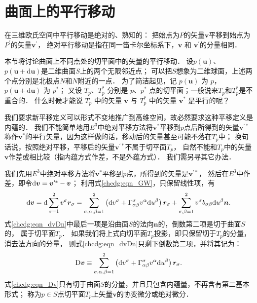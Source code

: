\section{曲面上的平行移动}\label{chcdg:sec_pt}
在三维欧氏空间中平行移动是绝对的、熟知的：
把始点为$P$的矢量$\boldsymbol{v}$平移到始点为$P^{\prime}$的矢量$\boldsymbol{v}^{\prime}$，
{\kaishu 绝对平行移动}是指在同一笛卡尔坐标系下，$\boldsymbol{v}$ 和 $\boldsymbol{v}^{\prime}$的分量相同．


本节将讨论曲面上不同点处的切平面中的矢量的平行移动．
设$p(\boldsymbol{u})$、$ p(\boldsymbol{u}+\mathrm{d} \boldsymbol{u})$是二维曲面$S$上的两个无限邻近点；
可以把$S$想象为二维球面，上述两个点分别是北极点$N$和$N$附近的一点．
为了简洁起见，记 $p(\boldsymbol{u})$ 为 $p$，$ p(\boldsymbol{u}+\mathrm{d} \boldsymbol{u})$ 为 $p^*$；
又设 $T_p$、$ T_p^*$ 分别是 $p$、$ p^*$ 点的切平面；一般说来$T_p$和$ T_p^*$是不重合的．
什么时候才能说 $T_p$ 中的矢量 $\boldsymbol{v}$ 与 $T_p^*$ 中的矢量 $\boldsymbol{v}^*$ 是平行的呢？

我们要求{\kaishu 新平移定义}可以形式不变地推广到高维空间，故必然要求这种平移定义是内蕴的．
我们不能简单地用$E^3$中绝对平移方法将$\boldsymbol{v}^*$平移到$p$点后所得到的矢量$\boldsymbol{v}^{\prime *}$
称作$\boldsymbol{v}^*$的平行矢量，因为这样做的话，移动后的矢量甚至可能不落在$T_p$中；
换句话说，按照绝对平移，平移后的矢量$\boldsymbol{v}^{\prime *}$不属于切平面$T_p$，
自然不能和$T_p$中的矢量$\boldsymbol{v}$作差或相比较（指内蕴方式作差，不是外蕴方式）．
我们需另寻其它办法．

我们先用$E^3$中绝对平移方法将$\boldsymbol{v}^*$平移到$p$点，所得到的矢量是$\boldsymbol{v}^{\prime *}$，
然后在$E^3$中作差，即令${\rm d} \boldsymbol{v} = \boldsymbol{v}^{\prime *} -\boldsymbol{v}$；
利用式\eqref{chcdg:eqn_GW}，只保留线性项，有
\begin{align}
    {\rm d} \boldsymbol{v}= \mathrm{d} \sum_{\sigma=1}^{2} v^\sigma \boldsymbol{r}_\sigma 
    = \sum_{\sigma,\alpha,\beta=1}^{2} \left(\mathrm{d}   v^\sigma  
    + \Gamma_{\alpha \beta}^\sigma v^\alpha \mathrm{d} u^\beta  \right) \boldsymbol{r}_\sigma
    + \sum_{\sigma,\beta=1}^{2} v^\sigma b_{\sigma \beta}  \mathrm{d} u^\beta \boldsymbol{n} . 
    \label{chcdg:eqn_dvDn}
\end{align} %
式\eqref{chcdg:eqn_dvDn}中最后一项是沿曲面$S$的法向$\boldsymbol{n}$的，倒数第二项是切于曲面$S$的，
属于切平面$T_p$．
如果我们将上式向切平面$T_p$投影，即只保留切于$T_p$的分量，消去法方向的分量，
则式\eqref{chcdg:eqn_dvDn}只剩下倒数第二项，并将其记为：
\begin{equation}\label{chcdg:eqn_Dv}
    {\rm D} \boldsymbol{v} \equiv \sum_{\sigma,\alpha,\beta=1}^{2} \left(\mathrm{d} v^\sigma  
    +  \Gamma_{\alpha \beta}^\sigma v^\alpha \mathrm{d} u^\beta  \right) \boldsymbol{r}_\sigma .
\end{equation}
式\eqref{chcdg:eqn_Dv}只有切于曲面$S$的分量，并且只包含内蕴量，不再含有第二基本形式；
称为$p\in S$点切平面$T_p$上矢量$\boldsymbol{v}$的{\heiti 协变微分}或{\heiti 绝对微分}．

